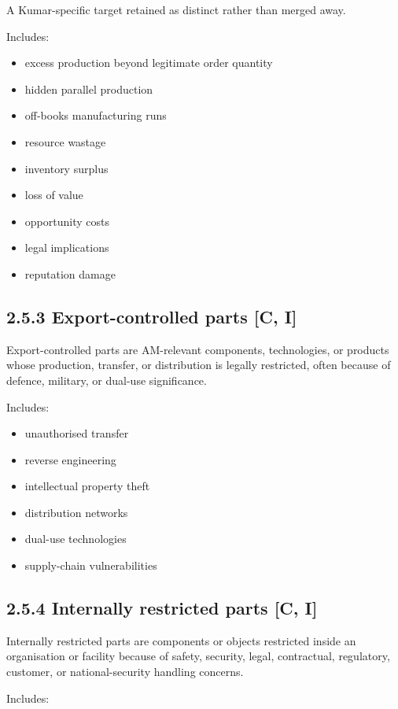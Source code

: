 \documentclass[10pt,a4paper,oneside]{report}
\begin{document}
A Kumar-specific target retained as distinct rather than merged away.

Includes:

\begin{itemize}
\item excess production beyond legitimate order quantity
\item hidden parallel production
\item off-books manufacturing runs
\item resource wastage
\item inventory surplus
\item loss of value
\item opportunity costs
\item legal implications
\item reputation damage
\end{itemize}


\subsection{2.5.3 Export-controlled parts [C, I]}


Export-controlled parts are AM-relevant components, technologies, or products whose production, transfer, or distribution is legally restricted, often because of defence, military, or dual-use significance.

Includes:

\begin{itemize}
\item unauthorised transfer
\item reverse engineering
\item intellectual property theft
\item distribution networks
\item dual-use technologies
\item supply-chain vulnerabilities
\end{itemize}


\subsection{2.5.4 Internally restricted parts [C, I]}


Internally restricted parts are components or objects restricted inside an organisation or facility because of safety, security, legal, contractual, regulatory, customer, or national-security handling concerns.

Includes:
\end{document}
